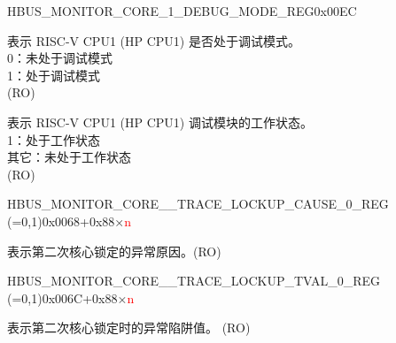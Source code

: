 \begin{register}{H}{BUS\_MONITOR\_CORE\_1\_DEBUG\_MODE\_REG}{0x00EC}\label{regdesc:BUSMONITORCORE1DEBUGMODEREG}
%
%
%
\regnewline%
\begin{regdesc}\begin{reglist}
\label{fielddesc:BUSMONITORCORE1DEBUGMODE}\item [BUS\_MONITOR\_CORE\_1\_DEBUG\_MODE] 表示 RISC-V CPU1 (HP CPU1) 是否处于调试模式。\\
0：未处于调试模式\\
1：处于调试模式\\ (RO)
\label{fielddesc:BUSMONITORCORE1DEBUGMODULEACTIVE}\item [BUS\_MONITOR\_CORE\_1\_DEBUG\_MODULE\_ACTIVE] 表示 RISC-V CPU1 (HP CPU1) 调试模块的工作状态。\\
1：处于工作状态\\
其它：未处于工作状态\\ (RO)
\end{reglist}\end{regdesc}
\end{register}


\begin{register}{H}{BUS\_MONITOR\_CORE\_\_TRACE\_LOCKUP\_CAUSE\_0\_REG (=0,1)}{0x0068+0x88×\textcolor{red}{n}}\label{regdesc:BUSMONITORCORE0TRACELOCKUPCAUSE0REG}
%
%
\regnewline%
\begin{regdesc}\begin{reglist}
\label{fielddesc:BUSMONITORCORE0TRACELOCKUPRECORDINGCAUSE0}\item [BUS\_MONITOR\_CORE\_\regindex{n}\_TRACE\_LOCKUP\_RECORDING\_CAUSE\_0] 表示第二次核心锁定的异常原因。(RO)
\end{reglist}\end{regdesc}
\end{register}


\begin{register}{H}{BUS\_MONITOR\_CORE\_\_TRACE\_LOCKUP\_TVAL\_0\_REG (=0,1)}{0x006C+0x88×\textcolor{red}{n}}\label{regdesc:BUSMONITORCORE0TRACELOCKUPTVAL0REG}
%
\regnewline%
\begin{regdesc}\begin{reglist}
\label{fielddesc:BUSMONITORCORE0TRACELOCKUPRECORDINGTVAL0}\item [BUS\_MONITOR\_CORE\_\regindex{n}\_TRACE\_LOCKUP\_RECORDING\_TVAL\_0] 表示第二次核心锁定时的异常陷阱值。 (RO)
\end{reglist}\end{regdesc}
\end{register}


